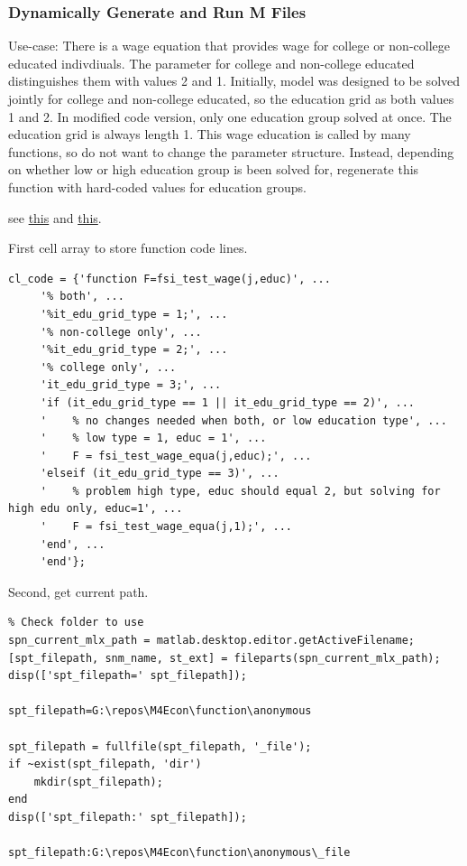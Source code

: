 \documentclass[
]{book}
\begin{document}
\hypertarget{dynamically-generate-and-run-m-files}{%
\subsubsection{Dynamically Generate and Run M Files}\label{dynamically-generate-and-run-m-files}}

Use-case: There is a wage equation that provides wage for college or
non-college educated indivdiuals. The parameter for college and
non-college educated distinguishes them with values 2 and 1. Initially,
model was designed to be solved jointly for college and non-college
educated, so the education grid as both values 1 and 2. In modified code
version, only one education group solved at once. The education grid is
always length 1. This wage education is called by many functions, so do
not want to change the parameter structure. Instead, depending on
whether low or high education group is been solved for, regenerate this
function with hard-coded values for education groups.

see
\href{https://www.mathworks.com/matlabcentral/answers/407161-how-to-use-one-matlab-program-to-create-a-new-m-file-and-insert-executable-code-into-it-which-is-fr}{this}
and
\href{https://www.mathworks.com/matlabcentral/answers/13077-error-with-dynamically-created-m-files}{this}.

First cell array to store function code lines.

\begin{verbatim}
cl_code = {'function F=fsi_test_wage(j,educ)', ...
     '% both', ...
     '%it_edu_grid_type = 1;', ...
     '% non-college only', ...
     '%it_edu_grid_type = 2;', ...
     '% college only', ...
     'it_edu_grid_type = 3;', ...
     'if (it_edu_grid_type == 1 || it_edu_grid_type == 2)', ...
     '    % no changes needed when both, or low education type', ...
     '    % low type = 1, educ = 1', ...
     '    F = fsi_test_wage_equa(j,educ);', ...
     'elseif (it_edu_grid_type == 3)', ...
     '    % problem high type, educ should equal 2, but solving for high edu only, educ=1', ...
     '    F = fsi_test_wage_equa(j,1);', ...
     'end', ...
     'end'};
\end{verbatim}

Second, get current path.

\begin{verbatim}
% Check folder to use
spn_current_mlx_path = matlab.desktop.editor.getActiveFilename;
[spt_filepath, snm_name, st_ext] = fileparts(spn_current_mlx_path);
disp(['spt_filepath=' spt_filepath]);

spt_filepath=G:\repos\M4Econ\function\anonymous

spt_filepath = fullfile(spt_filepath, '_file');
if ~exist(spt_filepath, 'dir')
    mkdir(spt_filepath);
end
disp(['spt_filepath:' spt_filepath]);

spt_filepath:G:\repos\M4Econ\function\anonymous\_file
\end{verbatim}
\end{document}
